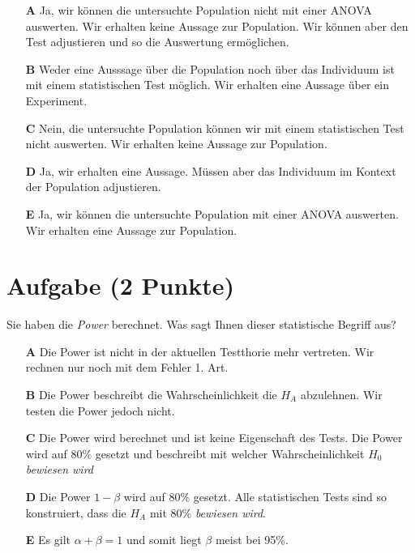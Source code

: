 \documentclass[a4paper, 9pt]{scrartcl}\usepackage[]{graphicx}\usepackage[]{xcolor}
\begin{document}
\begin{enumerate}
\item [\textbf{A} \msquare] Ja, wir können die untersuchte Population nicht mit einer ANOVA auswerten. Wir erhalten keine Aussage zur Population. Wir können aber den Test adjustieren und so die Auswertung ermöglichen.
\item [\textbf{B} \msquare] Weder eine Ausssage über die Population noch über das Individuum ist mit einem statistischen Test möglich. Wir erhalten eine Aussage über ein Experiment.
\item [\textbf{C} \msquare] Nein, die untersuchte Population können wir mit einem statistischen Test nicht auswerten. Wir erhalten keine Aussage zur Population.
\item [\textbf{D} \msquare] Ja, wir erhalten eine Aussage. Müssen aber das Individuum im Kontext der Population adjustieren.
\item [\textbf{E} \msquare] Ja, wir können die untersuchte Population mit einer ANOVA auswerten. Wir erhalten eine Aussage zur Population.
\end{enumerate}

\section{Aufgabe \hfill (2 Punkte)}



Sie haben die \textit{Power} berechnet. Was sagt Ihnen dieser statistische Begriff aus?



\begin{enumerate}
\item [\textbf{A} \msquare] Die Power ist nicht in der aktuellen Testthorie mehr vertreten. Wir rechnen nur noch mit dem Fehler 1. Art.
\item [\textbf{B} \msquare] Die Power beschreibt die Wahrscheinlichkeit die $H_A$ abzulehnen. Wir testen die Power jedoch nicht.
\item [\textbf{C} \msquare] Die Power wird berechnet und ist keine Eigenschaft des Tests. Die Power wird auf $80\%$ gesetzt und beschreibt mit welcher Wahrscheinlichkeit $H_0$ \textit{bewiesen wird}
\item [\textbf{D} \msquare] Die Power $1-\beta$ wird auf 80\% gesetzt. Alle statistischen Tests sind so konstruiert, dass die $H_A$ mit 80\% \textit{bewiesen wird}.
\item [\textbf{E} \msquare] Es gilt $\alpha + \beta = 1$ und somit liegt $\beta$ meist bei 95\%.
\end{enumerate}
\end{document}
